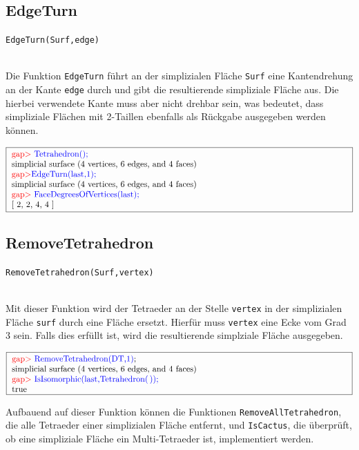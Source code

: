 \documentclass[12pt,titlepage,twoside,cleardoublepage]{article}
\theoremstyle{nummermitklammern}
\numberwithin{equation}{section}
\begin{document}
\subsection{EdgeTurn}
\begin{large}
\texttt{EdgeTurn(Surf,edge)}
\end{large}\\
Die Funktion \texttt{EdgeTurn} führt an der simplizialen Fläche \texttt{Surf} eine Kantendrehung an der Kante \texttt{edge} durch und gibt die resultierende simpliziale Fläche aus. Die hierbei verwendete Kante muss aber nicht drehbar sein, was bedeutet, dass simpliziale Flächen mit 2-Taillen ebenfalls als Rückgabe ausgegeben werden können. 
\begin{center}
$\fbox{
\parbox{14cm}{
\textcolor{red}{gap$>$} \textcolor{blue}{Tetrahedron();}\newline
simplicial surface (4 vertices, 6 edges, and 4 faces)\newline
\textcolor{red}{gap$>$}\textcolor{blue}{ EdgeTurn(last,1);}\newline
simplicial surface (4 vertices, 6 edges, and 4 faces)\newline
\textcolor{red}{gap$>$} \textcolor{blue}{FaceDegreesOfVertices(last);}\newline
[ 2, 2, 4, 4 ]
}
}$
\end{center}

\subsection{RemoveTetrahedron}
\begin{large}
\texttt{RemoveTetrahedron(Surf,vertex)}
\end{large}\\
Mit dieser Funktion wird der Tetraeder an der Stelle \texttt{vertex} in der simplizialen Fläche \texttt{surf} durch eine Fläche ersetzt. Hierfür muss \texttt{vertex} eine Ecke vom Grad 3 sein. Falls dies erfüllt ist, wird die resultierende simplziale Fläche ausgegeben. 
\begin{center}
$\fbox{
\parbox{14cm}{
\textcolor{red}{gap$>$} \textcolor{blue}{RemoveTetrahedron(DT,1)};\newline
simplicial surface (4 vertices, 6 edges, and 4 faces)\newline
\textcolor{red}{gap$>$} \textcolor{blue}{IsIsomorphic(last,Tetrahedron(\,));}\newline
true
}
}$
\end{center}
Aufbauend auf dieser Funktion können die Funktionen \texttt{RemoveAllTetrahedron}, die alle Tetraeder einer simplizialen Fläche entfernt, und \texttt{IsCactus}, die überprüft, ob eine simpliziale Fläche ein Multi-Tetraeder ist, implementiert werden.
\end{document}
